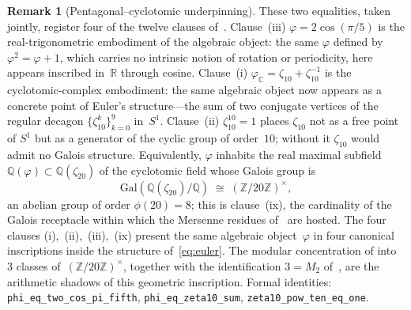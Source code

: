 \documentclass[11pt]{amsart}
\theoremstyle{definition}
\newtheorem{Remark}[Theorem]{Remark}
\newcommand{\golden}{\varphi}
\newcommand{\Ztwenty}{(\mathbb{Z}/20\mathbb{Z})^{\times}}
\newcommand{\lean}[1]{\texttt{#1}}
\begin{document}
\begin{Remark}[Pentagonal--cyclotomic underpinning]
These two equalities, taken jointly, register four of the twelve
clauses of~.  Clause~(iii)
$\golden=2\cos(\pi/5)$ is the real-trigonometric embodiment of the
algebraic object: the same $\golden$ defined by $\golden^{2}=\golden+1$,
which carries no intrinsic notion of rotation or periodicity, here
appears inscribed in~$\mathbb{R}$ through cosine.  Clause~(i)
$\golden_\mathbb{C}=\zeta_{10}+\zeta_{10}^{-1}$ is the
cyclotomic-complex embodiment: the same algebraic object now appears as
a concrete point of Euler's structure---the sum of two conjugate
vertices of the regular decagon $\{\zeta_{10}^{k}\}_{k=0}^{9}$
in~$S^{1}$.  Clause~(ii) $\zeta_{10}^{10}=1$ places $\zeta_{10}$ not
as a free point of $S^{1}$ but as a generator of the cyclic group of
order~$10$; without it $\zeta_{10}$ would admit no Galois structure.
Equivalently, $\golden$ inhabits the real maximal subfield
$\mathbb{Q}(\golden)\subset\mathbb{Q}(\zeta_{20})$ of the cyclotomic
field whose Galois group is
\[
  \mathrm{Gal}(\mathbb{Q}(\zeta_{20})/\mathbb{Q}) \;\cong\;
  \Ztwenty,
\]
an abelian group of order $\phi(20)=8$; this is clause~(ix), the
cardinality of the Galois receptacle within which the Mersenne
residues of~ are hosted.  The four
clauses (i),~(ii),~(iii),~(ix) present the same algebraic
object~$\golden$ in four canonical inscriptions inside the structure
of~\eqref{eq:euler}.  The modular concentration of
 into~$3$ classes of~$\Ztwenty$, together
with the identification $3=M_{2}$ of~, are the
arithmetic shadows of this geometric inscription.  Formal identities:
\lean{phi\_eq\_two\_cos\_pi\_fifth}, \lean{phi\_eq\_zeta10\_sum},
\lean{zeta10\_pow\_ten\_eq\_one}.
\end{Remark}
\end{document}
